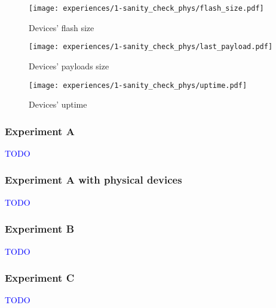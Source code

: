 \begin{figure}[H]
\centering
\texttt{[image: experiences/1-sanity\_check\_phys/flash\_size.pdf]}
\caption[Devices' flash size]{Devices' flash size}\label{fig:sanity_check_phys_flash_size}
\end{figure}

\begin{figure}[h]
\centering
\texttt{[image: experiences/1-sanity\_check\_phys/last\_payload.pdf]}
\caption[Devices' payloads size]{Devices' payloads size}\label{fig:sanity_check_phys_last_payload}
\end{figure}

\begin{figure}[h]
\centering
\texttt{[image: experiences/1-sanity\_check\_phys/uptime.pdf]}
\caption[Devices' uptime]{Devices' uptime}\label{fig:sanity_check_phys_uptime}
\end{figure}


\subsubsection{Experiment A}

\textcolor{blue}{TODO}


\subsubsection{Experiment A with physical devices}

\textcolor{blue}{TODO}


\subsubsection{Experiment B}

\textcolor{blue}{TODO}


\subsubsection{Experiment C}

\textcolor{blue}{TODO}


